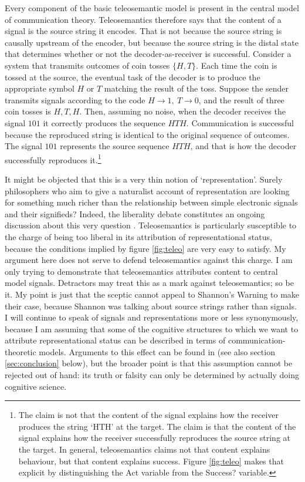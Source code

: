 

Every component of the basic teleosemantic model is present in the central model of communication theory.
Teleosemantics therefore says that the content of a signal is the source string it encodes.
That is not because the source string is causally upstream of the encoder, but because the source string is the distal state that determines whether or not the decoder-as-receiver is successful.
Consider a system that transmits outcomes of coin tosses $\{H,T\}$.
Each time the coin is tossed at the source, the eventual task of the decoder is to produce the appropriate symbol $H$ or $T$ matching the result of the toss.
Suppose the sender transmits signals according to the code $H\rightarrow1,\ T\rightarrow0$, and the result of three coin tosses is $H, T, H$.
Then, assuming no noise, when the decoder receives the signal $101$ it correctly produces the sequence $HTH$.
Communication is successful because the reproduced string is identical to the original sequence of outcomes.
The signal $101$ represents the source sequence $HTH$, and that is how the decoder successfully reproduces it.\footnote{The claim is not that the content of the signal explains how the receiver produces the string `HTH' at the target. The claim is that the content of the signal explains how the receiver successfully reproduces the source string at the target. In general, teleosemantics claims not that content explains behaviour, but that content explains success. Figure \ref{fig:teleo} makes that explicit by distinguishing the Act variable from the Success? variable.}

It might be objected that this is a very thin notion of `representation'.
Surely philosophers who aim to give a naturalist account of representation are looking for something much richer than the relationship between simple electronic signals and their signifieds?
Indeed, the liberality debate constitutes an ongoing discussion about this very question \citep{artiga2016liberal,artiga2022strong,desouzafilho2022dual}.
Teleosemantics is particularly susceptible to the charge of being too liberal in its attribution of representational status, because the conditions implied by figure \ref{fig:teleo} are very easy to satisfy.
My argument here does not serve to defend teleosemantics against this charge.
I am only trying to demonstrate that teleosemantics attributes content to central model signals.
Detractors may treat this as a mark against teleosemantics; so be it.
My point is just that the sceptic cannot appeal to {\sc Shannon's Warning} to make their case, because Shannon was talking about source strings rather than signals.
I will continue to speak of signals and representations more or less synonymously, because I am assuming that some of the cognitive structures to which we want to attribute representational status can be described in terms of communication-theoretic models.
Arguments to this effect can be found in \citet{martinez2019representations} (see also section \ref{sec:conclusion} below), but the broader point is that this assumption cannot be rejected out of hand: its truth or falsity can only be determined by actually doing cognitive science.

